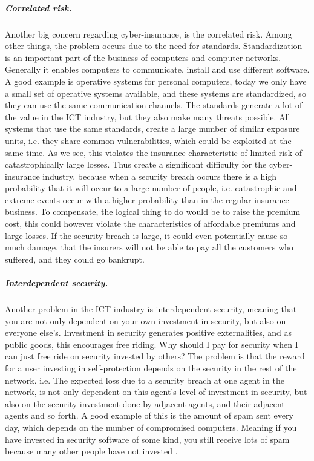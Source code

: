       
\subparagraph{Correlated risk.}

Another big concern regarding cyber-insurance, is the correlated risk. Among other things, the problem occurs due to the need for standards. Standardization is an important part of the business of computers and computer networks. Generally it enables computers to communicate, install and use different software. A good example is operative systems for personal computers, today we only have a small set of operative systems available, and these systems are standardized, so they can use the same communication channels. The standards generate a lot of the value in the ICT industry, but they also make many threats possible. All systems that use the same standards, create a large number of similar exposure units, i.e. they share common vulnerabilities, which could be exploited at the same time. As we see, this violates the insurance characteristic of limited risk of catastrophically large losses.  
Thus create a significant difficulty for the cyber-insurance industry, because when a security breach occurs there is a high probability that it will occur to a large number of people, i.e. catastrophic and extreme events occur with a higher probability than in the regular insurance business. To compensate, the logical thing to do would be to raise the premium cost, this could however violate the characteristics of affordable premiums and large losses. 
If the security breach is large, it could even potentially cause so much damage, that the insurers will not be able to pay all the customers who suffered, and they could go bankrupt.\cite{bohme2010modeling}


\subparagraph{Interdependent security.}
Another problem in the ICT industry is interdependent security, meaning that you are not only dependent on your own investment in security, but also on everyone else's. 
Investment in security generates positive externalities, and as public goods, this encourages free riding. Why should I pay for security when I can just free ride on security invested by others? The problem is that the reward for a user investing in self-protection depends on the security in the rest of the network. i.e. The expected loss due to a security breach at one agent in the network, is not only dependent on this agent's level of investment in security, but also on the security investment done by adjacent agents, and their adjacent agents and so forth. A good example of this is the amount of spam sent every day, which depends on the number of compromised computers. Meaning if you have invested in security software of some kind, you still receive lots of spam because many other people have not invested \cite{towardsInsurable}.
 
